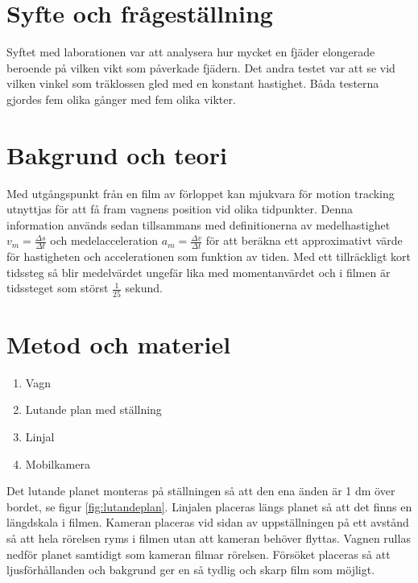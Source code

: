 \documentclass[11p, titlepage, oneside, a4paper]{article}
\begin{document}
	\newpage

	
	\setlength{\parindent}{0pt}
	\setlength{\parskip}{10pt}
	
	\section{Syfte och frågeställning}
		Syftet med laborationen var att analysera hur mycket en fjäder elongerade beroende på vilken vikt som påverkade fjädern. Det andra testet var att se vid vilken vinkel som träklossen gled med en konstant hastighet. Båda testerna gjordes fem olika gånger med fem olika vikter.

	\section{Bakgrund och teori}
        Med utgångspunkt från en film av förloppet kan mjukvara för motion tracking utnyttjas för att få fram vagnens position vid olika tidpunkter. Denna information används sedan tillsammans med definitionerna av medelhastighet $v_m = \frac{\Delta s}{\Delta t}$ och medelacceleration $a_m = \frac{\Delta v}{\Delta t}$ för att beräkna ett approximativt värde för hastigheten och accelerationen som funktion av tiden. Med ett tillräckligt kort tidssteg så blir medelvärdet ungefär lika med momentanvärdet och i filmen är tidssteget som störst $\frac{1}{25}$ sekund.  \parencite{impuls}
	

	\section{Metod och materiel}
        \begin{enumerate}
            \item Vagn
            \item Lutande plan med ställning
            \item Linjal
            \item Mobilkamera
        \end{enumerate}
        
        Det lutande planet monteras på ställningen så att den ena änden är 1 dm över bordet, se figur \ref{fig:lutandeplan}. Linjalen placeras längs planet så att det finns en längdskala  i filmen. Kameran placeras vid sidan av uppställningen på ett avstånd så att hela rörelsen ryms i filmen utan att kameran behöver flyttas. Vagnen rullas nedför planet samtidigt som kameran filmar rörelsen. Försöket placeras så att ljusförhållanden och bakgrund ger en så tydlig och skarp film som möjligt.
        
\end{document}
